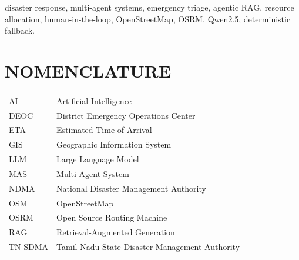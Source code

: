 \documentclass[conference]{IEEEtran}
\begin{document}
\begin{abstract}
Disaster response operations require rapid interpretation of incomplete incident reports, location-aware resource discovery, capacity protection, responder matching, and coordinated dispatch under severe time constraints. This paper presents the AI Disaster Response Coordinator, an autonomous multi-agent architecture designed for emergency triage, resource allocation, and incident dispatch. The system combines a local Qwen2.5:7B language model with a deterministic fallback path, agentic retrieval-augmented generation over Tamil Nadu disaster-management procedures, specialized shelter, hospital, and volunteer agents, and a planning agent that synthesizes operational constraints. A human-in-the-loop approval boundary separates recommendation generation from irreversible dispatch actions. Geographic reasoning uses OpenStreetMap data and the Open Source Routing Machine, while state and transactional updates are maintained through a persistent database layer. The prototype models 380 verified relief shelters, 210 healthcare facilities, and 305 certified responders. Evaluation covers triage reliability, shelter district-priority matching, capacity protection, volunteer skill matching, latency, offline behaviour, and transactional safety. Across the isolated test harness, the implementation achieved 100\% assertion-pass rate, zero shelter overbooking, correct atomic capacity release, and robust fallback behavior under simulated local-model timeout and offline conditions. The results indicate that a modular agent architecture with deterministic safeguards can provide a practical foundation for explainable and governable emergency coordination.
\end{abstract}

\begin{IEEEkeywords}
disaster response, multi-agent systems, emergency triage, agentic RAG, resource allocation, human-in-the-loop, OpenStreetMap, OSRM, Qwen2.5, deterministic fallback.
\end{IEEEkeywords}

\section*{NOMENCLATURE}
\begin{tabular}{ll}
AI & Artificial Intelligence \\
DEOC & District Emergency Operations Center \\
ETA & Estimated Time of Arrival \\
GIS & Geographic Information System \\
LLM & Large Language Model \\
MAS & Multi-Agent System \\
NDMA & National Disaster Management Authority \\
OSM & OpenStreetMap \\
OSRM & Open Source Routing Machine \\
RAG & Retrieval-Augmented Generation \\
TN-SDMA & Tamil Nadu State Disaster Management Authority \\
\end{tabular}
\end{document}
